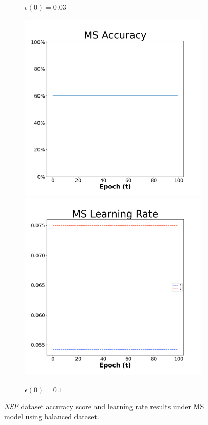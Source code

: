 \begin{figure}[H]
\begin{subfigure}{0.3\textwidth}
  \caption{$\epsilon(0)=0.03$}
\end{subfigure}\hfil %
\begin{subfigure}{0.3\textwidth}
  \includegraphics[width=\linewidth]{images/exper1/NSP/MS_0.1_acc.png}
  \includegraphics[width=\linewidth]{images/exper1/NSP/MS_0.1_lr.png}
  \caption{$\epsilon(0)=0.1$}
\end{subfigure}

\caption{\textit{NSP} dataset accuracy score and learning rate results under MS model using balanced dataset.}
\end{figure}

